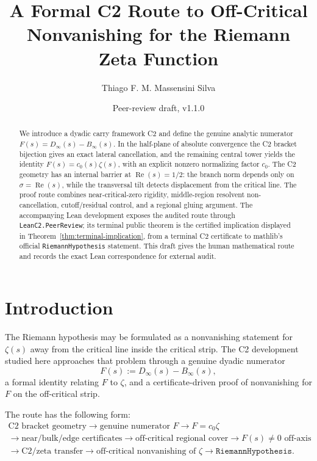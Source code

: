\documentclass[11pt]{article}
\title{A Formal C2 Route to Off-Critical Nonvanishing for the Riemann Zeta Function}
\author{Thiago F. M. Massensini Silva}
\date{Peer-review draft, v1.1.0}
\newcommand{\Zeta}{\zeta}
\newcommand{\RH}{\texttt{RiemannHypothesis}}
\begin{document}
\maketitle

\begin{abstract}
We introduce a dyadic carry framework C2 and define the genuine analytic
numerator \(F(s)=D_\infty(s)-B_\infty(s)\).  In the half-plane of absolute
convergence the C2 bracket bijection gives an exact lateral cancellation, and
the remaining central tower yields the identity \(F(s)=c_0(s)\zeta(s)\), with
an explicit nonzero normalizing factor \(c_0\).  The C2 geometry has an internal
barrier at \(\operatorname{Re}(s)=1/2\): the branch norm depends only on
\(\sigma=\operatorname{Re}(s)\), while the transversal tilt detects displacement
from the critical line.  The proof route combines near-critical-zero rigidity,
middle-region resolvent non-cancellation, cutoff/residual control, and a
regional gluing argument.  The accompanying Lean development exposes the
audited route through \texttt{LeanC2.PeerReview}; its terminal public theorem is
the certified implication displayed in Theorem~\ref{thm:terminal-implication},
from a terminal C2
certificate to mathlib's official \RH{} statement.  This draft gives the human
mathematical route and records the exact Lean correspondence for external
audit.
\end{abstract}

\section{Introduction}

The Riemann hypothesis may be formulated as a nonvanishing statement for
\(\Zeta(s)\) away from the critical line inside the critical strip.  The C2
development studied here approaches that problem through a genuine dyadic
numerator
\[
  F(s):=D_\infty(s)-B_\infty(s),
\]
a formal identity relating \(F\) to \(\Zeta\), and a certificate-driven proof of
nonvanishing for \(F\) on the off-critical strip.

The route has the following form:
\[
\begin{gathered}
\text{C2 bracket geometry}
  \longrightarrow \text{genuine numerator }F
  \longrightarrow F=c_0\zeta \\
  \longrightarrow \text{near/bulk/edge certificates}
  \longrightarrow \text{off-critical regional cover}
  \longrightarrow F(s)\ne 0 \text{ off-axis} \\
  \longrightarrow \text{C2/zeta transfer}
  \longrightarrow \text{off-critical nonvanishing of } \Zeta
  \longrightarrow \RH .
\end{gathered}
\]
\end{document}
